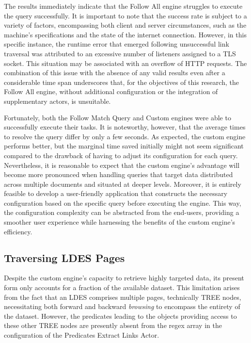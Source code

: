 The results immediately indicate that the Follow All engine struggles to execute the query successfully. It is important to note that the success rate is subject to a variety of factors, encompassing both client and server circumstances, such as the machine's specifications and the state of the internet connection. However, in this specific instance, the runtime error that emerged following unsuccessful link traversal was attributed to an excessive number of listeners assigned to a TLS socket. This situation may be associated with an overflow of HTTP requests. The combination of this issue with the absence of any valid results even after a considerable time span underscores that, for the objectives of this research, the Follow All engine, without additional configuration or the integration of supplementary actors, is unsuitable.

Fortunately, both the Follow Match Query and Custom engines were able to successfully execute their tasks. It is noteworthy, however, that the average times to resolve the query differ by only a few seconds. As expected, the custom engine performs better, but the marginal time saved initially might not seem significant compared to the drawback of having to adjust its configuration for each query. Nevertheless, it is reasonable to expect that the custom engine's advantage will become more pronounced when handling queries that target data distributed across multiple documents and situated at deeper levels. Moreover, it is entirely feasible to develop a user-friendly application that constructs the necessary configuration based on the specific query before executing the engine. This way, the configuration complexity can be abstracted from the end-users, providing a smoother user experience while harnessing the benefits of the custom engine's efficiency.

\subsection{Traversing LDES Pages}

Despite the custom engine's capacity to retrieve highly targeted data, its present form only accounts for a fraction of the available dataset. This limitation arises from the fact that an LDES comprises multiple pages, technically TREE nodes, necessitating both forward and backward \textit{browsing} to encompass the entirety of the dataset. However, the predicates leading to the objects providing access to these other TREE nodes are presently absent from the regex array in the configuration of the Predicates Extract Links Actor.

